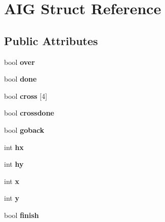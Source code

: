 \hypertarget{struct_a_i_g}{\section{A\+I\+G Struct Reference}
\label{struct_a_i_g}
}
\subsection*{Public Attributes}
\begin{DoxyCompactItemize}
\item 
\hypertarget{struct_a_i_g_a680c8095fe8e174e020544a7b0a5c18e}{bool {\bfseries over}}\label{struct_a_i_g_a680c8095fe8e174e020544a7b0a5c18e}

\item 
\hypertarget{struct_a_i_g_a4dceb572ca0f7a008944a4ae1d08372f}{bool {\bfseries done}}\label{struct_a_i_g_a4dceb572ca0f7a008944a4ae1d08372f}

\item 
\hypertarget{struct_a_i_g_ac5bafd38269b9cebc2be10b55ee94bb8}{bool {\bfseries cross} \mbox{[}4\mbox{]}}\label{struct_a_i_g_ac5bafd38269b9cebc2be10b55ee94bb8}

\item 
\hypertarget{struct_a_i_g_a6fc6bee1f2a83686f4df6146c306309c}{bool {\bfseries crossdone}}\label{struct_a_i_g_a6fc6bee1f2a83686f4df6146c306309c}

\item 
\hypertarget{struct_a_i_g_a1edfd767aa664f3b6dcbb4a871b5a2ec}{bool {\bfseries goback}}\label{struct_a_i_g_a1edfd767aa664f3b6dcbb4a871b5a2ec}

\item 
\hypertarget{struct_a_i_g_a22d145d6294926817de964b83b7d380c}{int {\bfseries hx}}\label{struct_a_i_g_a22d145d6294926817de964b83b7d380c}

\item 
\hypertarget{struct_a_i_g_a69d7d6dc8284221039931c30b340507e}{int {\bfseries hy}}\label{struct_a_i_g_a69d7d6dc8284221039931c30b340507e}

\item 
\hypertarget{struct_a_i_g_ae9174632330ac3925e0a78f8ecb500f7}{int {\bfseries x}}\label{struct_a_i_g_ae9174632330ac3925e0a78f8ecb500f7}

\item 
\hypertarget{struct_a_i_g_ab303efe94f3c9c4e73335a368666faad}{int {\bfseries y}}\label{struct_a_i_g_ab303efe94f3c9c4e73335a368666faad}

\item 
\hypertarget{struct_a_i_g_a9997a698f0b90a60f1a81a86d91dba73}{bool {\bfseries finish}}\label{struct_a_i_g_a9997a698f0b90a60f1a81a86d91dba73}


\end{DoxyCompactItemize}
